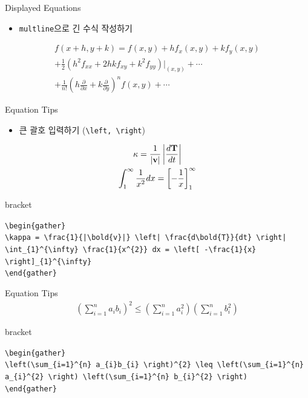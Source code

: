 \documentclass[12pt]{gshs_lecture}
\newcommand{\tb}{\textbackslash}
\newenvironment{codeblock}[1]{
	\begin{block}{#1}
		\setstretch{1.0}
		\begin{small}
}{
		\end{small}
	\end{block}
}
\begin{document}
\begin{frame}[t]{Displayed Equations}
	
	\begin{itemize}
		\item \texttt{multline}으로 긴 수식 작성하기
	\end{itemize}

	\begin{multline}
	f(x + h, y + k) = f(x, y) + h f_{x}(x, y) + k f_{y}(x, y) \\
	+ \frac{1}{2}(h^{2} f_{xx} + 2hk f_{xy} + k^{2} f_{yy})|_{(x, y)} + \cdots \\
	+ \frac{1}{n!}\left(h \frac{\partial}{\partial x} + k \frac{\partial}{\partial y}\right)^{n} f(x, y) + \cdots
	\end{multline}
\end{frame}

\begin{frame}[t]{Equation Tips}
	\begin{itemize}
		\item 큰 괄호 입력하기 (\texttt{\tb left, \tb right})
	\end{itemize}
	\begin{gather}
	\kappa = \frac{1}{|\bold{v}|}\left|\frac{d\bold{T}}{dt}\right| \\
	\int_{1}^{\infty} \frac{1}{x^{2}} dx = \left[-\frac{1}{x}\right]_{1}^{\infty}
	\end{gather}
	\begin{codeblock}{bracket}
	\texttt{\tb begin\{gather\}} \\
	\texttt{\tb kappa  = \tb frac\{1\}\{|\tb bold\{v\}|\} \tb left| \tb frac\{d\tb bold\{T\}\}\{dt\} \tb right|} \\
	\texttt{\tb int\_\{1\}\^{}\{\tb infty\} \tb frac\{1\}\{x\^{}\{2\}\} dx = \tb left[ -\tb frac\{1\}\{x\} \tb right]\_\{1\}\^{}\{\tb infty\}} \\
	\texttt{\tb end\{gather\}}
	\end{codeblock}
\end{frame}

\begin{frame}[t]{Equation Tips}
	\begin{gather}
	\left(\sum_{i=1}^{n} a_{i}b_{i}\right)^{2} \leq \left(\sum_{i=1}^{n}a_{i}^{2} \right) \left(\sum_{i=1}^{n}b_{i}^{2} \right)
	\end{gather}
	\begin{codeblock}{bracket}
		\texttt{\tb begin\{gather\}} \\
		\texttt{\tb left(\tb sum\_\{i=1\}\^{}\{n\} a\_\{i\}b\_\{i\} \tb right)\^{}\{2\} \tb leq \tb left(\tb sum\_\{i=1\}\^{}\{n\} a\_\{i\}\^{}\{2\} \tb right) \tb left(\tb sum\_\{i=1\}\^{}\{n\} b\_\{i\}\^{}\{2\} \tb right) \\ }
		\texttt{\tb end\{gather\}}
	\end{codeblock}
\end{frame}
\end{document}
